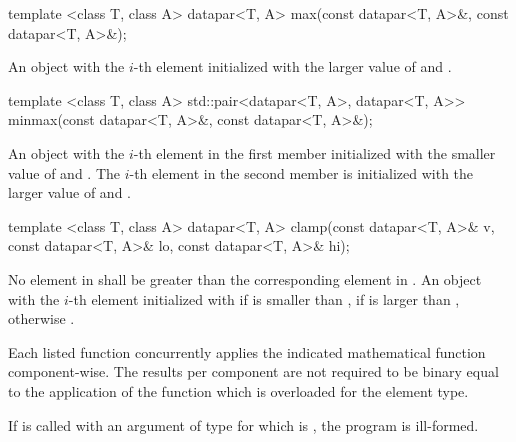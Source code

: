 \begin{itemdecl}
template <class T, class A>
datapar<T, A> max(const datapar<T, A>&, const datapar<T, A>&);
\end{itemdecl}
\begin{itemdescr}
  \pnum\returns An object with the $i$-th element initialized with the larger value of  and  \foralli.
\end{itemdescr}

\begin{itemdecl}
template <class T, class A>
std::pair<datapar<T, A>, datapar<T, A>> minmax(const datapar<T, A>&,
                                               const datapar<T, A>&);
\end{itemdecl}
\begin{itemdescr}
  \pnum\returns An object with the $i$-th element in the first  member initialized with the smaller value of  and  \foralli.
  The $i$-th element in the second  member is initialized with the larger value of  and  \foralli.
\end{itemdescr}

\begin{itemdecl}
template <class T, class A>
datapar<T, A> clamp(const datapar<T, A>& v, const datapar<T, A>& lo,
                    const datapar<T, A>& hi);
\end{itemdecl}
\begin{itemdescr}
  \pnum\requires No element in  shall be greater than the corresponding element in .
  \pnum\returns An object with the $i$-th element initialized with  if  is smaller than ,  if  is larger than , otherwise  \foralli.
\end{itemdescr}



\pnum Each listed function concurrently applies the indicated mathematical function component-wise.
The results per component are not required to be binary equal to the application of the function which is overloaded for the element type.

\pnum If  is called with an argument of type \datapar[<X, Abi>] for which  is \true, the program is ill-formed.

